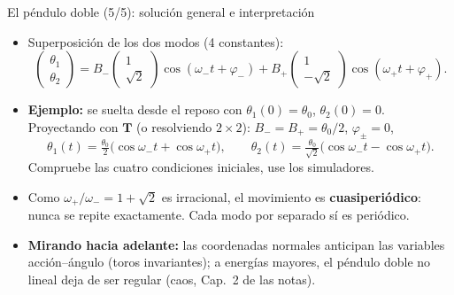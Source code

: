 \documentclass[spanish]{beamer}
\newcommand{\Tm}{\mathbf{T}}              %
\begin{document}
\begin{frame}{El péndulo doble (5/5): solución general e interpretación}
\begin{itemize}
\item<1-> Superposición de los dos modos (4 constantes):
\[
\begin{pmatrix}\theta_1\\ \theta_2\end{pmatrix}=
B_-\begin{pmatrix}1\\ \sqrt2\end{pmatrix}\cos(\omega_-t+\varphi_-)+
B_+\begin{pmatrix}1\\ -\sqrt2\end{pmatrix}\cos(\omega_+t+\varphi_+).
\]
\item<2-> \textbf{Ejemplo:} se suelta desde el reposo con $\theta_1(0)=\theta_0$, $\theta_2(0)=0$. Proyectando con $\Tm$ (o resolviendo $2\times2$): $B_-=B_+=\theta_0/2$, $\varphi_\pm=0$,
\[
\theta_1(t)=\tfrac{\theta_0}{2}\big(\cos\omega_-t+\cos\omega_+t\big),\qquad
\theta_2(t)=\tfrac{\theta_0}{\sqrt2}\big(\cos\omega_-t-\cos\omega_+t\big).
\]
Compruebe las cuatro condiciones iniciales, use los simuladores.
\item<3-> Como $\omega_+/\omega_-=1+\sqrt2$ es irracional, el movimiento es \textbf{cuasiperiódico}: nunca se repite exactamente. Cada modo por separado sí es periódico. 
\item<4-> \textbf{Mirando hacia adelante:} las coordenadas normales anticipan las variables acción--ángulo (toros invariantes); a energías mayores, el péndulo doble no lineal deja de ser regular (caos, Cap.~2 de las notas).
\end{itemize}
\end{frame}

\end{document}
